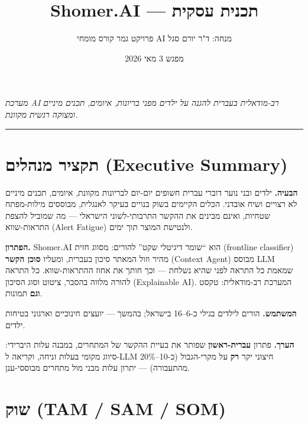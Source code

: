 \documentclass[11pt]{article}
\title{\textbf{Shomer.AI — תכנית עסקית}}
\author{פרויקט גמר \en{\textperiodcentered} קורס מומחי AI \en{\textperiodcentered} מנחה: ד"ר יורם סגל}
\date{מפגש 3 \en{\textperiodcentered} מאי 2026}
\newcommand{\en}[1]{\textenglish{#1}}
\begin{document}
\maketitle

\begin{center}
\textit{מערכת \en{AI} רב-מודאלית בעברית להגנה על ילדים מפני בריונות, איומים, תכנים מיניים ומצוקה רגשית מקוונת.}
\end{center}

\vspace{0.4cm}
\hrule
\vspace{0.6cm}

\section{תקציר מנהלים (\en{Executive Summary})}

\textbf{הבעיה.} ילדים ובני נוער דוברי עברית חשופים יום-יום לבריונות מקוונת, איומים, תכנים מיניים לא רצויים ושיח אובדני. הכלים הקיימים בשוק בנויים בעיקר לאנגלית, מבוססים מילות-מפתח שטחיות, ואינם מבינים את ההקשר התרבותי-לשוני הישראלי — מה שמוביל להצפת התראות-שווא (\en{Alert Fatigue}) ולנטישת המוצר תוך ימים.

\textbf{הפתרון.} \en{Shomer.AI} הוא ``שומר דיגיטלי שקט'' להורים: מסווג חזית (\en{frontline classifier}) מהיר וזול המאתר סיכון בעברית, ומעליו \textbf{סוכן הקשר} (\en{Context Agent}) מבוסס \en{LLM} שמאמת כל התראה לפני שהיא נשלחת — וכך חותך את אחוז ההתראות-שווא. כל התראה להורה מלווה בהסבר, ציטוט וסוג הסיכון (\en{Explainable AI}). המערכת רב-מודאלית: טקסט \textbf{וגם} תמונות.

\textbf{המשתמש.} הורים לילדים בגילי כ-6--16 בישראל; בהמשך — יועצים חינוכיים וארגוני בטיחות ילדים.

\textbf{הערך.} פתרון \textbf{עברית-ראשון} שפותר את בעיית ההקשר של המתחרים, במבנה עלות היברידי: סיווג מקומי בעלות זניחה, וקריאה ל-\en{LLM} חיצוני יקר \textbf{רק} על מקרי-הגבול (כ-\en{10--20\%} מהתעבורה) — יתרון עלות מבני מול מתחרים מבוססי-ענן.

\section{שוק (\en{TAM / SAM / SOM})}
\end{document}
